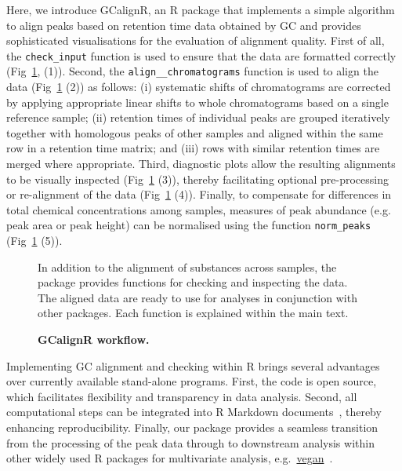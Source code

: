\documentclass[10pt,letterpaper]{article}
\begin{document}
Here, we introduce GCalignR, an R package that implements a simple algorithm to align peaks based on retention time data obtained by GC and provides sophisticated visualisations for the evaluation of alignment quality. First of all, the \texttt{check\_input} function is used to ensure that the data are formatted correctly (Fig~\ref{Fig:Fig1}, (1)). Second, the \texttt{align\_\_chromatograms} function is used to align the data (Fig~\ref{Fig:Fig1} (2)) as follows: (i) systematic shifts of chromatograms are corrected by applying appropriate linear shifts to whole chromatograms based on a single reference sample; (ii) retention times of individual peaks are grouped iteratively together with homologous peaks of other samples and aligned within the same row in a retention time matrix; and (iii) rows with similar retention times are merged where appropriate. Third, diagnostic plots allow the resulting alignments to be visually inspected (Fig~\ref{Fig:Fig1} (3)), thereby facilitating optional pre-processing or re-alignment of the data (Fig~\ref{Fig:Fig1} (4)). Finally, to compensate for differences in total chemical concentrations among samples, measures of peak abundance (e.g. peak area or peak height) can be normalised using the function \texttt{norm\_peaks} (Fig~\ref{Fig:Fig1} (5)). \par

\begin{figure}[htbp]
\centering
\caption{\textbf{GCalignR workflow.}} 
In addition to the alignment of substances across samples, the package provides functions for checking and inspecting the data. The aligned data are ready to use for analyses in conjunction with other packages. Each function is explained within the main text.
\label{Fig:Fig1}
\end{figure}

Implementing GC alignment and checking within R brings several advantages over currently available stand-alone programs. First, the code is open source, which facilitates flexibility and transparency in data analysis. Second, all computational steps can be integrated into R Markdown documents~\cite{Allaire.2016}, thereby enhancing reproducibility. Finally, our package provides a seamless transition from the processing of the peak data through to downstream analysis within other widely used R packages for multivariate analysis, e.g.~\href{https://CRAN.R-project.org/package=vegan}{vegan}~\cite{Oksanen.2016}.
\end{document}

